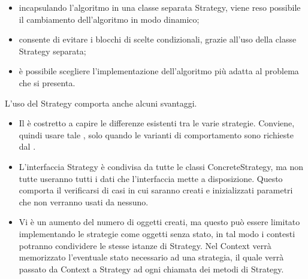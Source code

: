 		\begin{itemize}
			\item incapsulando l'algoritmo in una classe separata Strategy, viene reso possibile il cambiamento dell'algoritmo in modo dinamico;
			\item consente di evitare i blocchi di scelte condizionali, grazie all'uso della classe Strategy separata;
			\item è possibile scegliere l'implementazione dell'algoritmo più adatta al problema che si presenta.
		\end{itemize}
		L'uso del  Strategy comporta anche alcuni svantaggi. 
		\begin{itemize}
			\item Il  è costretto a capire le differenze esistenti tra le varie strategie. Conviene, quindi usare tale , solo quando le varianti di comportamento sono richieste dal .
			\item L'interfaccia Strategy è condivisa da tutte le classi ConcreteStrategy, ma non tutte useranno tutti i dati che l'interfaccia mette a disposizione. Questo comporta il verificarsi di casi in cui saranno creati e inizializzati parametri che non verranno usati da nessuno.
			\item Vi è un aumento del numero di oggetti creati, ma questo può essere limitato implementando le strategie come oggetti senza stato, in tal modo i contesti potranno condividere le stesse istanze di Strategy. Nel Context verrà memorizzato l'eventuale stato necessario ad una strategia, il quale verrà passato da Context a Strategy ad ogni chiamata dei metodi di Strategy.
		\end{itemize}


